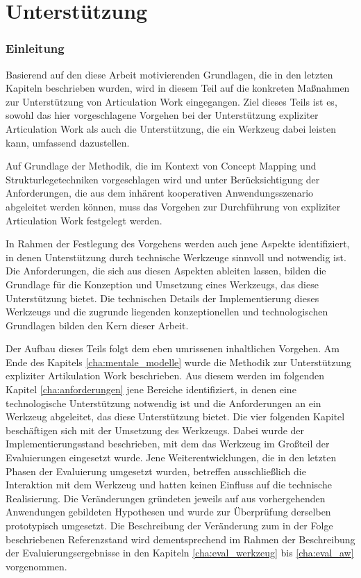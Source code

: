 \part{Unterstützung} %
\label{prt:umsetzung}

\section*{Einleitung} %
\label{sec:umsetzung_einleitung}
\thispagestyle{empty}

Basierend auf den diese Arbeit motivierenden Grundlagen, die in den letzten Kapiteln beschrieben wurden, wird in diesem Teil auf die konkreten Maßnahmen zur Unterstützung von Articulation Work eingegangen. Ziel dieses Teils ist es, sowohl das hier vorgeschlagene Vorgehen bei der Unterstützung expliziter Articulation Work als auch die Unterstützung, die ein Werkzeug dabei leisten kann, umfassend dazustellen.

Auf Grundlage der Methodik, die im Kontext von Concept Mapping und Strukturlegetechniken vorgeschlagen wird und unter Berücksichtigung der Anforderungen, die aus dem inhärent kooperativen Anwendungsszenario abgeleitet werden können, muss das Vorgehen zur Durchführung von expliziter Articulation Work festgelegt werden. 

In Rahmen der Festlegung des Vorgehens werden auch jene Aspekte identifiziert, in denen Unterstützung durch technische Werkzeuge sinnvoll und notwendig ist. Die Anforderungen, die sich aus diesen Aspekten ableiten lassen, bilden die Grundlage für die Konzeption und Umsetzung eines Werkzeugs, das diese Unterstützung bietet. Die technischen Details der Implementierung dieses Werkzeugs und die zugrunde liegenden konzeptionellen und technologischen Grundlagen bilden den Kern dieser Arbeit.

Der Aufbau dieses Teils folgt dem eben umrissenen inhaltlichen Vorgehen. Am Ende des Kapitels \ref{cha:mentale_modelle} wurde die Methodik zur Unterstützung expliziter Artikulation Work beschrieben. Aus diesem werden im folgenden Kapitel \ref{cha:anforderungen} jene Bereiche identifiziert, in denen eine technologische Unterstützung notwendig ist und die Anforderungen an ein Werkzeug abgeleitet, das diese Unterstützung bietet. Die vier folgenden Kapitel beschäftigen sich mit der Umsetzung des Werkzeugs. Dabei wurde der Implementierungsstand beschrieben, mit dem das Werkzeug im Großteil der Evaluierungen eingesetzt wurde. Jene Weiterentwicklungen, die in den letzten Phasen der Evaluierung umgesetzt wurden, betreffen ausschließlich die Interaktion mit dem Werkzeug und hatten keinen Einfluss auf die technische Realisierung. Die Veränderungen gründeten jeweils auf aus vorhergehenden Anwendungen gebildeten Hypothesen und wurde zur Überprüfung derselben prototypisch umgesetzt. Die Beschreibung der Veränderung zum in der Folge beschriebenen Referenzstand wird dementsprechend im Rahmen der Beschreibung der Evaluierungsergebnisse in den Kapiteln \ref{cha:eval_werkzeug} bis \ref{cha:eval_aw} vorgenommen.

